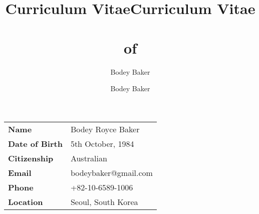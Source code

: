 \documentclass[10pt, a4paper]{report}
\title{Curriculum Vitae}
\author{Bodey Baker}
\title{Curriculum Vitae\\~\\of}
\author{Bodey Baker}%
\begin{document}

\begin{minipage}{0.2\linewidth}
\begin{tabular}{ll}
{\bf Name} & Bodey Royce Baker \\ 
{\bf Date of Birth} & 5th October, 1984 \\
{\bf Citizenship} & Australian \\
{\bf Email} & bodeybaker@gmail.com \\
{\bf Phone} & {\footnotesize +}82-10-6589-1006 \\
{\bf Location} & Seoul, South Korea \\

\end{tabular}
\end{minipage}
\hfill
\begin{minipage}{0.5\linewidth}
{%


\vspace{0.7em}


}%
\end{minipage}

\vfill
\end{document}
